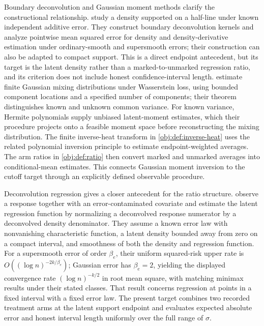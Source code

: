 Boundary deconvolution and Gaussian moment methods clarify the constructional relationship. \citet{ZhangKarunamuni2009Boundary} study a density supported on a half-line under known independent additive error. They construct boundary deconvolution kernels and analyze pointwise mean squared error for density and density-derivative estimation under ordinary-smooth and supersmooth errors; their construction can also be adapted to compact support. This is a direct endpoint antecedent, but its target is the latent density rather than a marked-to-unmarked regression ratio, and its criterion does not include honest confidence-interval length. \citet[Theorem~1; Section~4.1]{WuYang2020DenoisedMoments} estimate finite Gaussian mixing distributions under Wasserstein loss, using bounded component locations and a specified number of components; their theorem distinguishes known and unknown common variance. For known variance, Hermite polynomials supply unbiased latent-moment estimates, which their procedure projects onto a feasible moment space before reconstructing the mixing distribution. The finite inverse-heat transform in \cref{obj:def:inverse-heat} uses the related polynomial inversion principle to estimate endpoint-weighted averages. The arm ratios in \cref{obj:def:ratio} then convert marked and unmarked averages into conditional-mean estimates. This connects Gaussian moment inversion to the cutoff target through an explicitly defined observable procedure.

Deconvolution regression gives a closer antecedent for the ratio structure. \citet[Section~2, Theorems~2 and 5--6]{Fan1993} observe a response together with an error-contaminated covariate and estimate the latent regression function by normalizing a deconvolved response numerator by a deconvolved density denominator. They assume a known error law with nonvanishing characteristic function, a latent density bounded away from zero on a compact interval, and smoothness of both the density and regression function. For a supersmooth error of order \(\beta_e\), their uniform squared-risk upper rate is \(O((\log n)^{-2k/\beta_e})\); Gaussian error has \(\beta_e=2\), yielding the displayed convergence rate \((\log n)^{-k/2}\) in root mean square, with matching minimax results under their stated classes. That result concerns regression at points in a fixed interval with a fixed error law. The present target combines two recorded treatment arms at the latent support endpoint and evaluates expected absolute error and honest interval length uniformly over the full range of \(\sigma\).

